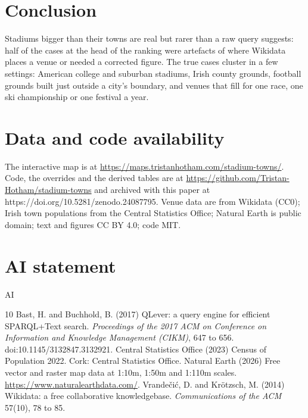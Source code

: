 \documentclass[11pt,a4paper]{article}
\begin{document}
\section{Conclusion}
Stadiums bigger than their towns are real but rarer than a raw query suggests: half of the cases at the head of the ranking were artefacts of where Wikidata places a venue or needed a corrected figure. The true cases cluster in a few settings: American college and suburban stadiums, Irish county grounds, football grounds built just outside a city's boundary, and venues that fill for one race, one ski championship or one festival a year.

\section*{Data and code availability}
The interactive map is at \url{https://maps.tristanhotham.com/stadium-towns/}. Code, the overrides and the derived tables are at \url{https://github.com/Tristan-Hotham/stadium-towns} and archived with this paper at https://doi.org/10.5281/zenodo.24087795. Venue data are from Wikidata (CC0); Irish town populations from the Central Statistics Office; Natural Earth is public domain; text and figures CC BY 4.0; code MIT.

\section*{AI statement}
{{AI}}

\begin{thebibliography}{10}
 Bast, H. and Buchhold, B. (2017) QLever: a query engine for efficient SPARQL+Text search. \textit{Proceedings of the 2017 ACM on Conference on Information and Knowledge Management (CIKM)}, 647 to 656. doi:10.1145/3132847.3132921.
 Central Statistics Office (2023) Census of Population 2022. Cork: Central Statistics Office.
 Natural Earth (2026) Free vector and raster map data at 1:10m, 1:50m and 1:110m scales. \url{https://www.naturalearthdata.com/}.
 Vrandečić, D. and Krötzsch, M. (2014) Wikidata: a free collaborative knowledgebase. \textit{Communications of the ACM} 57(10), 78 to 85.
\end{thebibliography}
\end{document}
